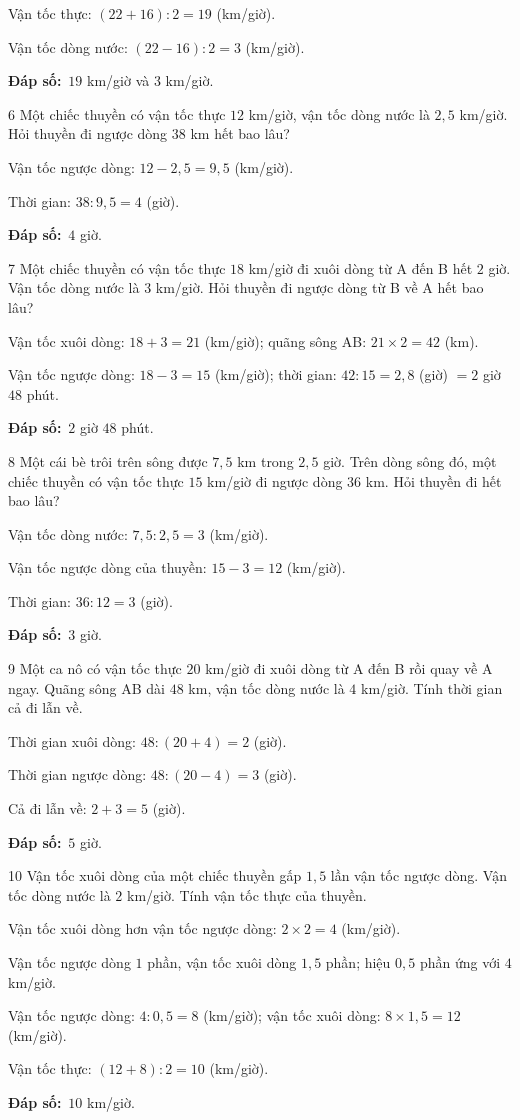 \documentclass[11pt]{article}
\newif\ifsol \solfalse
\providecommand{\AnsWord}{Đáp số}
\newcommand{\dapso}[1]{\par\textbf{\AnsWord:}\ #1}
\newcommand{\probsol}[1]{%
  \begin{lrbox}{\solmeasure}\begin{minipage}{\dimexpr\linewidth-24pt\relax}#1\end{minipage}\end{lrbox}%
  \ifsol
    \begin{solbox}#1\end{solbox}%
  \else
    \setlength{\solht}{\dimexpr\ht\solmeasure+\dp\solmeasure+0.85cm\relax}%
    \ifdim\solht<1.35cm\setlength{\solht}{1.35cm}\fi
    \begin{tcolorbox}[colback=white,colframe=Line,boxrule=0.8pt,arc=5pt,
      left=8pt,right=8pt,top=4pt,bottom=4pt,height=\solht]{\footnotesize\color{Slate}\itshape\WorkWord}\end{tcolorbox}%
  \fi}
\newcommand{\gap}{\vspace{0.3cm}}
\def\WorkWord{Bài làm:}
\def\AnsWord{Đáp số}
\begin{document}
\probsol{
Vận tốc thực: $(22+16):2=19$ (km/giờ).\par Vận tốc dòng nước: $(22-16):2=3$ (km/giờ).
\dapso{$19$ km/giờ và $3$ km/giờ.}}
\gap
\begin{probbox}{6}{\relax}
Một chiếc thuyền có vận tốc thực $12$ km/giờ, vận tốc dòng nước là $2{,}5$ km/giờ. Hỏi thuyền đi ngược dòng $38$ km hết bao lâu?
\end{probbox}
\probsol{
Vận tốc ngược dòng: $12-2{,}5=9{,}5$ (km/giờ).\par Thời gian: $38:9{,}5=4$ (giờ).
\dapso{$4$ giờ.}}
\gap
\begin{probbox}{7}{\relax}
Một chiếc thuyền có vận tốc thực $18$ km/giờ đi xuôi dòng từ A đến B hết $2$ giờ. Vận tốc dòng nước là $3$ km/giờ. Hỏi thuyền đi ngược dòng từ B về A hết bao lâu?
\end{probbox}
\probsol{
Vận tốc xuôi dòng: $18+3=21$ (km/giờ); quãng sông AB: $21\times2=42$ (km).\par
Vận tốc ngược dòng: $18-3=15$ (km/giờ); thời gian: $42:15=2{,}8$ (giờ) $=2$ giờ $48$ phút.
\dapso{$2$ giờ $48$ phút.}}
\gap
\begin{probbox}{8}{\relax}
Một cái bè trôi trên sông được $7{,}5$ km trong $2{,}5$ giờ. Trên dòng sông đó, một chiếc thuyền có vận tốc thực $15$ km/giờ đi ngược dòng $36$ km. Hỏi thuyền đi hết bao lâu?
\end{probbox}
\probsol{
Vận tốc dòng nước: $7{,}5:2{,}5=3$ (km/giờ).\par Vận tốc ngược dòng của thuyền: $15-3=12$ (km/giờ).\par Thời gian: $36:12=3$ (giờ).
\dapso{$3$ giờ.}}
\gap
\begin{probbox}{9}{\relax}
Một ca nô có vận tốc thực $20$ km/giờ đi xuôi dòng từ A đến B rồi quay về A ngay. Quãng sông AB dài $48$ km, vận tốc dòng nước là $4$ km/giờ. Tính thời gian cả đi lẫn về.
\end{probbox}
\probsol{
Thời gian xuôi dòng: $48:(20+4)=2$ (giờ).\par Thời gian ngược dòng: $48:(20-4)=3$ (giờ).\par Cả đi lẫn về: $2+3=5$ (giờ).
\dapso{$5$ giờ.}}
\gap
\begin{probbox}{10}{\relax}
Vận tốc xuôi dòng của một chiếc thuyền gấp $1{,}5$ lần vận tốc ngược dòng. Vận tốc dòng nước là $2$ km/giờ. Tính vận tốc thực của thuyền.
\end{probbox}
\probsol{
Vận tốc xuôi dòng hơn vận tốc ngược dòng: $2\times2=4$ (km/giờ).\par
Vận tốc ngược dòng $1$ phần, vận tốc xuôi dòng $1{,}5$ phần; hiệu $0{,}5$ phần ứng với $4$ km/giờ.\par
Vận tốc ngược dòng: $4:0{,}5=8$ (km/giờ); vận tốc xuôi dòng: $8\times1{,}5=12$ (km/giờ).\par
Vận tốc thực: $(12+8):2=10$ (km/giờ).
\dapso{$10$ km/giờ.}}
\end{document}

